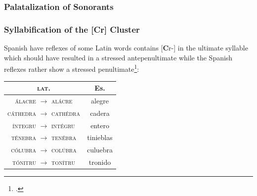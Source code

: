 \documentclass{report}[12pt]
\begin{document}
\subsubsection*{Palatalization of Sonorants}

\begin{tcolorbox}

\end{tcolorbox}

\subsubsection{Syllabification of the [Cr] Cluster}

Spanish have reflexes of some Latin words contains [\textbf{C}r-] in the ultimate syllable which should have resulted in a stressed antepenultimate while the Spanish reflexes rather show a stressed penultimate\footcite[p.~115]{lloyd_spanish}:
\begin{center}
  \begin{tabular}{c c}
  \textsc{lat.} & Es. \\
  \hline
  \textsc{\'{a}lacre} $\rightarrow$ \textsc{al\'{a}cre} & alegre \\
  \textsc{c\'{a}thedra} $\rightarrow$ \textsc{cath\'{e}dra} & cadera \\
  \textsc{\'{i}ntegru} $\rightarrow$ \textsc{int\'{e}gru} & entero \\
  \textsc{t\'{e}nebra} $\rightarrow$ \textsc{ten\'{e}bra} & tinieblas \\
  \textsc{c\'{o}lubra} $\rightarrow$ \textsc{col\'{u}bra} & culuebra \\
  \textsc{t\'{o}nitru} $\rightarrow$ \textsc{ton\'{i}tru} & tronido \\
  \end{tabular}
\end{center}

\pagebreak
\end{document}
